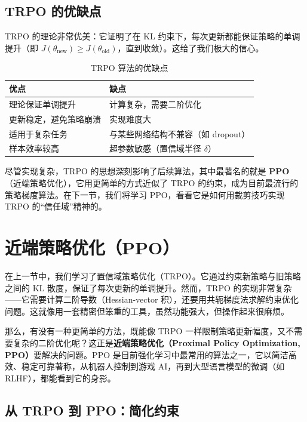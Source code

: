 \documentclass[lang=cn,zihao=-4,a4paper,fontset=windows]{beautybook}
\begin{document}
\subsection{TRPO 的优缺点}

TRPO 的理论非常优美：它证明了在 KL 约束下，每次更新都能保证策略的单调提升（即 \(J(\theta_{\text{new}}) \ge J(\theta_{\text{old}})\)，直到收敛）。这给了我们极大的信心。

\begin{table}[H]
\centering
\caption{TRPO 算法的优缺点}
\begin{tabular}{p{}p{}}
\toprule
\textbf{优点} & \textbf{缺点} \\
\midrule
理论保证单调提升 & 计算复杂，需要二阶优化 \\
更新稳定，避免策略崩溃 & 实现难度大 \\
适用于复杂任务 & 与某些网络结构不兼容（如 dropout） \\
样本效率较高 & 超参数敏感（置信域半径 $\delta$） \\
\bottomrule
\end{tabular}
\end{table}

尽管实现复杂，TRPO 的思想深刻影响了后续算法，其中最著名的就是 \textbf{PPO}（近端策略优化），它用更简单的方式近似了 TRPO 的约束，成为目前最流行的策略梯度算法。在下一节，我们将学习 PPO，看看它是如何用裁剪技巧实现 TRPO 的“信任域”精神的。

\section{近端策略优化（PPO）}

在上一节中，我们学习了置信域策略优化（TRPO）。它通过约束新策略与旧策略之间的 KL 散度，保证了每次更新的单调提升。然而，TRPO 的实现非常复杂——它需要计算二阶导数（Hessian-vector 积），还要用共轭梯度法求解约束优化问题。这就像用一套精密但笨重的工具，虽然功能强大，但操作起来很麻烦。

那么，有没有一种更简单的方法，既能像 TRPO 一样限制策略更新幅度，又不需要复杂的二阶优化呢？这正是\textbf{近端策略优化（Proximal Policy Optimization, PPO）}要解决的问题。PPO 是目前强化学习中最常用的算法之一，它以简洁高效、稳定可靠著称，从机器人控制到游戏 AI，再到大型语言模型的微调（如 RLHF），都能看到它的身影。

\subsection{从 TRPO 到 PPO：简化约束}
\end{document}
